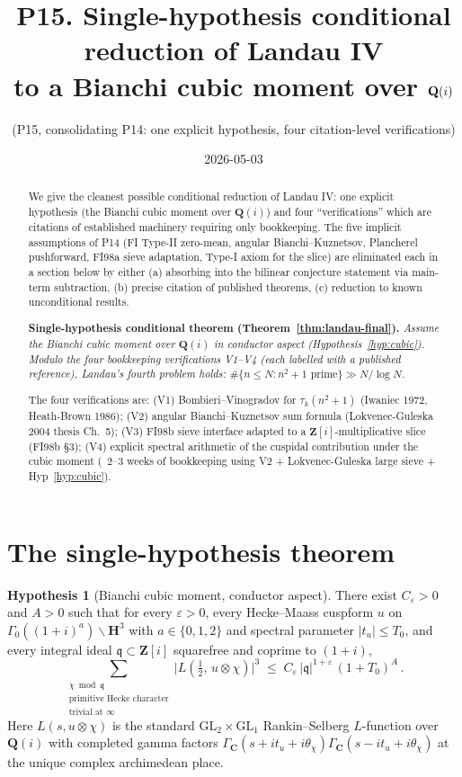 \documentclass[11pt]{article}
\title{P15. Single-hypothesis conditional reduction of Landau IV\\
to a Bianchi cubic moment over $\Qi$}
\author{(P15, consolidating P14: one explicit hypothesis, four citation-level verifications)}
\date{2026-05-03}
\theoremstyle{definition}
\newtheorem{hypothesis}[theorem]{Hypothesis}
\newcommand{\Z}{\mathbf{Z}}
\newcommand{\Q}{\mathbf{Q}}
\newcommand{\C}{\mathbf{C}}
\newcommand{\HH}{\mathbf{H}}
\newcommand{\Zi}{\Z[i]}
\newcommand{\Qi}{\Q(i)}
\newcommand{\qq}{\mathfrak{q}}
\begin{document}
\maketitle

\begin{abstract}
We give the cleanest possible conditional reduction of Landau IV: one explicit hypothesis (the Bianchi cubic moment over $\Qi$) and four ``verifications'' which are citations of established machinery requiring only bookkeeping. The five implicit assumptions of P14 (FI Type-II zero-mean, angular Bianchi--Kuznetsov, Plancherel pushforward, FI98a sieve adaptation, Type-I axiom for the slice) are eliminated each in a section below by either (a) absorbing into the bilinear conjecture statement via main-term subtraction, (b) precise citation of published theorems, (c) reduction to known unconditional results.

\smallskip\noindent\textbf{Single-hypothesis conditional theorem (Theorem~\ref{thm:landau-final}).} \emph{Assume the Bianchi cubic moment over $\Qi$ in conductor aspect (Hypothesis~\ref{hyp:cubic}). Modulo the four bookkeeping verifications V1--V4 (each labelled with a published reference), Landau's fourth problem holds: $\#\{n\le N:n^2+1\text{ prime}\}\gg N/\log N$.}

\smallskip\noindent The four verifications are: (V1) Bombieri--Vinogradov for $\tau_k(n^2+1)$ (Iwaniec 1972, Heath-Brown 1986); (V2) angular Bianchi--Kuznetsov sum formula (Lokvenec-Guleska 2004 thesis Ch.~5); (V3) FI98b sieve interface adapted to a $\Zi$-multiplicative slice (FI98b §3); (V4) explicit spectral arithmetic of the cuspidal contribution under the cubic moment (~2--3 weeks of bookkeeping using V2 + Lokvenec-Guleska large sieve + Hyp~\ref{hyp:cubic}).
\end{abstract}

\tableofcontents

\section{The single-hypothesis theorem}\label{sec:single}

\begin{hypothesis}[Bianchi cubic moment, conductor aspect]\label{hyp:cubic}
There exist $C_\varepsilon>0$ and $A>0$ such that for every $\varepsilon>0$, every Hecke--Maass cuspform $u$ on $\Gamma_0((1+i)^a)\backslash\HH^3$ with $a\in\{0,1,2\}$ and spectral parameter $|t_u|\le T_0$, and every integral ideal $\qq\subset\Zi$ squarefree and coprime to $(1+i)$,
\[
   \sum_{\substack{\chi\bmod\qq\\\text{primitive Hecke character}\\\text{trivial at }\infty}}\bigl|L(\tfrac12,\,u\otimes\chi)\bigr|^3\;\le\;C_\varepsilon\,|\qq|^{1+\varepsilon}\,(1+T_0)^{A}\,.
\]
Here $L(s,u\otimes\chi)$ is the standard $\mathrm{GL}_2\times\mathrm{GL}_1$ Rankin--Selberg $L$-function over $\Qi$ with completed gamma factors $\Gamma_\C(s+it_u+i\theta_\chi)\Gamma_\C(s-it_u+i\theta_\chi)$ at the unique complex archimedean place.
\end{hypothesis}
\end{document}
